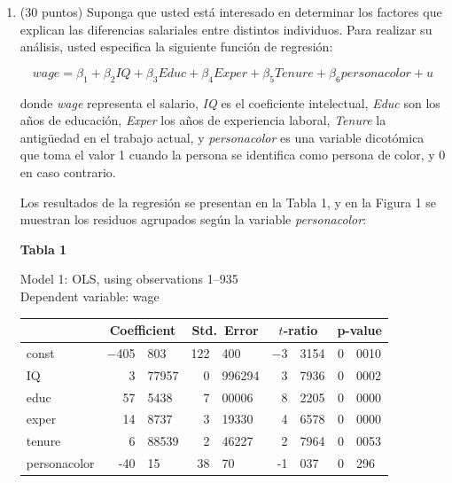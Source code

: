 \documentclass[10pt,a4paper]{article}
\begin{document}
\begin{enumerate}
  Testee con un 1\% de significancia si el tipo cambio nominal tiene raíz unitaria. Explique su resultado.  




\item (30 puntos) Suponga que usted está interesado en determinar los factores que explican
las diferencias salariales entre distintos individuos. Para realizar
su análisis, usted especifica la siguiente función de regresión:

\begin{equation}
wage = \beta_{1} + \beta_{2}IQ + \beta_{3}Educ + \beta_{4}Exper + \beta_{5}Tenure + \beta_{6}personacolor + u \label{eq:original}
\end{equation}

donde \emph{wage} representa el salario, \emph{IQ} es el coeficiente intelectual,
\emph{Educ} son los años de educación, \emph{Exper} los años de experiencia laboral,
\emph{Tenure} la antigüedad en el trabajo actual, y \emph{personacolor} es una variable dicotómica
que toma el valor 1 cuando la persona se identifica como {persona de color}, y 0 en caso contrario.


Los resultados de la regresión se presentan en la Tabla 1, y en la Figura 1 se muestran los residuos
agrupados según la variable \emph{personacolor}:

\begin{center}
\textbf{Tabla 1}
\end{center}

\begin{center}
Model 1: OLS, using observations 1--935\\ Dependent variable: wage\\
\vspace{1em}
\begin{tabular}{lr@{.}lr@{.}lr@{.}lr@{.}l}
 &  \multicolumn{2}{c}{Coefficient} &   \multicolumn{2}{c}{Std.\ Error} &    \multicolumn{2}{c}{$t$-ratio} &     \multicolumn{2}{c}{p-value} \\
\hline
const &   $-$405&803 &     122&400 &       $-$3&3154 &         0&0010 \\
IQ &   3&77957 &     0&996294 &       3&7936 &         0&0002 \\
educ &   57&5438 &     7&00006 &       8&2205 &         0&0000 \\
exper &   14&8737 &     3&19330 &       4&6578 &         0&0000 \\
tenure &   6&88539 &     2&46227 &       2&7964 &         0&0053 \\
personacolor & -40&15 & 38&70 & -1&037 & 0&296\\
\end{tabular}
\vspace{1ex}


\end{center}
\end{enumerate}
\end{document}
